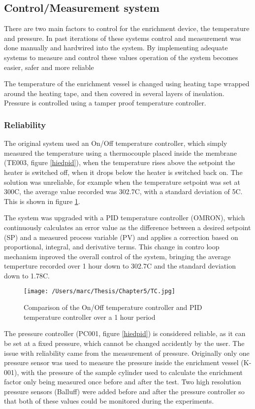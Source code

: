 \subsection{Control/Measurement system}
There are two main factors to control for the enrichment device, the temperature and pressure. In past iterations of these systems control and measurement was done manually and hardwired into the system. By implementing adequate systems to measure and control these values operation of the system becomes easier, safer and more reliable 

The temperature of the enrichment vessel is changed using heating tape wrapped around the heating tape, and then covered in several layers of insulation. Pressure is controlled using a tamper proof temperature controller.  

\subsubsection*{Reliability}
The original system used an On/Off temperature controller, which simply measured the temperature using a thermocouple placed inside the membrane (TE003, figure \ref{hiedpid}), when the temperature rises above the setpoint the heater is switched off, when it drops below the heater is switched back on. The solution was unreliable, for example when the temperature setpoint was set at 300\textdegree C, the average value recorded was 302.7\textdegree C, with a standard deviation of 5\textdegree C. This is shown in figure \ref{TCcompare}. 

The system was upgraded with a PID temperature controller (OMRON), which continuously calculates an error value as the difference between a desired setpoint (SP) and a measured process variable (PV) and applies a correction based on proportional, integral, and derivative terms. This change in contro loop mechanism inproved the overall control of the system, bringing the average temperture recorded over 1 hour down to 302.7\textdegree C and the standard deviation down to 1.78\textdegree C.

\begin{figure}
    \centering
    \texttt{[image: /Users/marc/Thesis/Chapter5/TC.jpg]}
    \caption{Comparison of the On/Off temperature controller and PID temperature controller over a 1 hour period}
    \label{TCcompare}
\end{figure}

The pressure controller (PC001, figure \ref{hiedpid}) is considered reliable, as it can be set at a fixed pressure, which cannot be changed accidently by the user. The issue with reliability came from the measurement of pressure. Originally only one pressure sensor was used to measure the pressure inside the enrichment vessel (K-001), with the pressure of the sample cylinder used to calculate the enrichment factor only being measured once before and after the test. Two high resolution pressure sensors (Balluff) were added before and after the pressure controller so that both of these values could be monitored during the experiments. 

